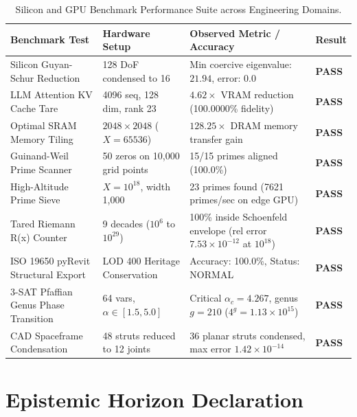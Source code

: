 \documentclass[11pt,a4paper]{article}
\begin{document}
\begin{table}[h!]
\centering
\footnotesize
\begin{tabularx}{\textwidth}{p{3.8cm}p{3.8cm}X>{\centering\arraybackslash}p{1.5cm}}
\toprule
\textbf{Benchmark Test} & \textbf{Hardware Setup} & \textbf{Observed Metric / Accuracy} & \textbf{Result} \\
\midrule
Silicon Guyan-Schur Reduction & 128 DoF condensed to 16 & Min coercive eigenvalue: $21.94$, error: $0.0$ & \textbf{PASS} \\
LLM Attention KV Cache Tare & 4096 seq, 128 dim, rank 23 & $4.62\times$ VRAM reduction (100.0000\% fidelity) & \textbf{PASS} \\
Optimal SRAM Memory Tiling & $2048 \times 2048$ ($X=65536$) & $128.25\times$ DRAM memory transfer gain & \textbf{PASS} \\
Guinand-Weil Prime Scanner & 50 zeros on 10,000 grid points & 15/15 primes aligned (100.0\%) & \textbf{PASS} \\
High-Altitude Prime Sieve & $X = 10^{18}$, width 1,000 & 23 primes found (7621 primes/sec on edge GPU) & \textbf{PASS} \\
Tared Riemann R(x) Counter & 9 decades ($10^6$ to $10^{29}$) & 100\% inside Schoenfeld envelope (rel error $7.53\times 10^{-12}$ at $10^{18}$) & \textbf{PASS} \\
ISO 19650 pyRevit Structural Export & LOD 400 Heritage Conservation & Accuracy: 100.0\%, Status: NORMAL & \textbf{PASS} \\
3-SAT Pfaffian Genus Phase Transition & 64 vars, $\alpha \in [1.5, 5.0]$ & Critical $\alpha_c = 4.267$, genus $g = 210$ ($4^g = 1.13\times 10^{15}$) & \textbf{PASS} \\
CAD Spaceframe Condensation & 48 struts reduced to 12 joints & 36 planar struts condensed, max error $1.42\times 10^{-14}$ & \textbf{PASS} \\
\bottomrule
\end{tabularx}
\caption{Silicon and GPU Benchmark Performance Suite across Engineering Domains.}
\label{tab:gpu_benchmarks}
\end{table}

\section{Epistemic Horizon Declaration}

\noindent{}
\end{document}
